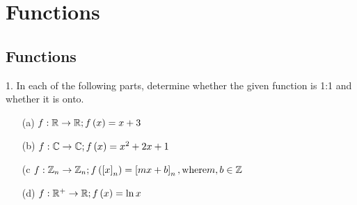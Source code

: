 
\section{Functions}
\subsection{Functions}
\begin{mdframed}[style=darkQuesion]
  1.   In each of the following parts, determine whether the given function is
  1:1 and whether it is onto.
  \begin{itemize}
    \item [(a)]{
          $f:\mathbb{R}\to \mathbb{R}; f\left(x\right)=x+3$
          }
    \item [(b)]{
          $f:\mathbb{C}\to \mathbb{C}; f\left(x\right)=x^2+2x+1$
          }
    \item [(c]{
          $f:\mathbb{Z}_n\to \mathbb{Z}_n; f\left(\left[x\right]_n\right)=\left[mx+b\right]_n, \text{where} m,b\in \mathbb{Z}$
          }
    \item [(d)]{
          $f:\mathbb{R}^+\to \mathbb{R}; f\left(x\right)=\ln x$
          }
  \end{itemize}
\end{mdframed}

